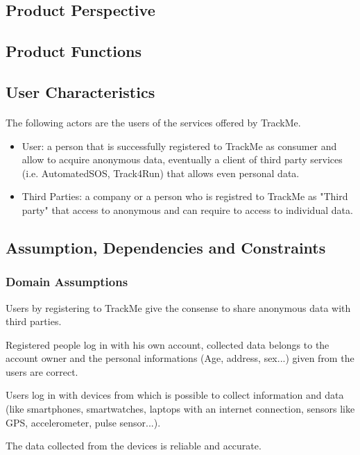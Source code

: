 \documentclass[a4paper]{article}
\begin{document}
\subsection{Product Perspective}

\subsection{Product Functions}

\subsection{User Characteristics}

\paragraph{}The following actors are the users of the services offered by TrackMe. 


\begin{itemize}
    \item User:  a person that is successfully registered to TrackMe as consumer and allow to acquire anonymous data, eventually a client of third party services (i.e. AutomatedSOS, Track4Run) that allows even personal data.
    
    \item Third Parties:  a company or a person who is registred to TrackMe as "Third party" that access to anonymous and can require to access to individual data.
    
\end{itemize}

\subsection{Assumption, Dependencies and Constraints}

\subsubsection{Domain Assumptions}


\begin{enumerate}[label={[D.\arabic*]}]
    \item Users by registering to TrackMe give the consense to share anonymous data with third parties.
    \item Registered people log in with his own account, collected data belongs to the account owner and the personal informations (Age, address, sex...) given from the users are correct.
    \item Users log in with devices from which is possible to collect information and data (like smartphones, smartwatches, laptops with an internet connection, sensors like GPS, accelerometer, pulse sensor...).
    \item The data collected from the devices is reliable and accurate.
\end{enumerate}
\end{document}
